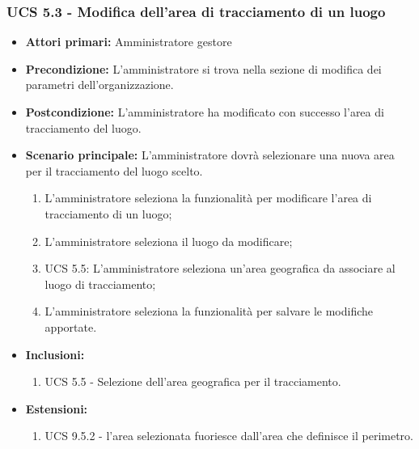 \subsubsection{UCS 5.3 - Modifica dell'area di tracciamento di un luogo}%
\begin{itemize}
    \item \textbf{Attori primari:} Amministratore gestore
    \item \textbf{Precondizione:} L'amministratore si trova nella sezione di modifica dei parametri dell'organizzazione.
    \item \textbf{Postcondizione:} L'amministratore ha modificato con successo l'area di tracciamento del luogo.
    \item \textbf{Scenario principale:} L'amministratore dovrà selezionare una nuova area per il tracciamento del luogo scelto.
    \begin{enumerate}%
        \item L'amministratore seleziona la funzionalità per modificare l'area di tracciamento di un luogo;
        \item L'amministratore seleziona il luogo da modificare;
        \item UCS 5.5: L'amministratore seleziona un'area geografica da associare al luogo di tracciamento;
        \item L'amministratore seleziona la funzionalità per salvare le modifiche apportate.
    \end{enumerate}
    \item \textbf{Inclusioni:}
    \begin{enumerate}
        \item UCS 5.5 - Selezione dell'area geografica per il tracciamento.
    \end{enumerate}
    \item \textbf{Estensioni:}
    \begin{enumerate}
        \item UCS 9.5.2 - l'area selezionata fuoriesce dall'area che definisce il perimetro.
    \end{enumerate}
\end{itemize}

